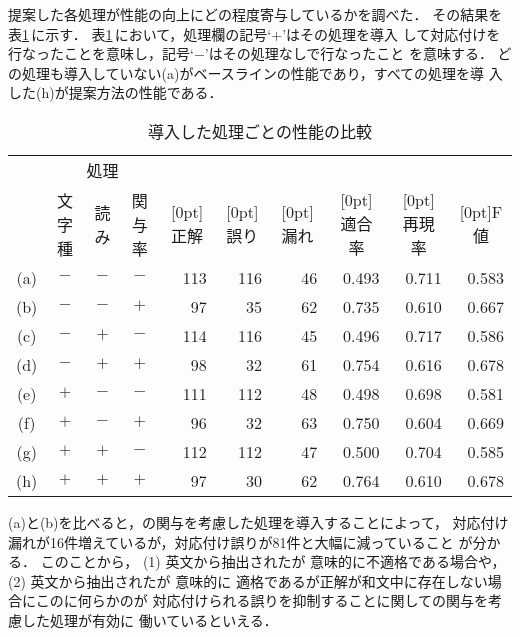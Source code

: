 提案した各処理が性能の向上にどの程度寄与しているかを調べた．
その結果を表\ref{tab:cond-effect}\,に示す．
表\ref{tab:cond-effect}\,において，処理欄の記号`$+$'はその処理を導入
して対応付けを行なったことを意味し，記号`$-$'はその処理なしで行なったこと
を意味する．
どの処理も導入していない(a)がベースラインの性能であり，すべての処理を導
入した(h)が提案方法の性能である．
\begin{table}[htbp]
\caption{導入した処理ごとの性能の比較}
\label{tab:cond-effect}
\begin{center}
\begin{tabular}{|c|c|c|c||r|r|r|r|r|r|}\hline
& \multicolumn{3}{|c||}{処理} & & & & & & \\\cline{2-4}
& 文字種 & 読み & 関与率 & \multicolumn{1}{c|}{\raisebox{1.5ex}[0pt]{正解}} & 
\multicolumn{1}{c|}{\raisebox{1.5ex}[0pt]{誤り}} &  
\multicolumn{1}{c|}{\raisebox{1.5ex}[0pt]{漏れ}} & 
\multicolumn{1}{c|}{\raisebox{1.5ex}[0pt]{適合率}} & 
\multicolumn{1}{c|}{\raisebox{1.5ex}[0pt]{再現率}} & 
\multicolumn{1}{c|}{\raisebox{1.5ex}[0pt]{F値}} \\\hline\hline
(a) & $-$ & $-$ & $-$ & 113 & 116 & 46 & 0.493 & 0.711 & 0.583 \\
(b) & $-$ & $-$ & $+$ &  97 &  35 & 62 & 0.735 & 0.610 & 0.667 \\
(c) & $-$ & $+$ & $-$ & 114 & 116 & 45 & 0.496 & 0.717 & 0.586 \\
(d) & $-$ & $+$ & $+$ &  98 &  32 & 61 & 0.754 & 0.616 & 0.678 \\
(e) & $+$ & $-$ & $-$ & 111 & 112 & 48 & 0.498 & 0.698 & 0.581 \\
(f) & $+$ & $-$ & $+$ &  96 &  32 & 63 & 0.750 & 0.604 & 0.669 \\
(g) & $+$ & $+$ & $-$ & 112 & 112 & 47 & 0.500 & 0.704 & 0.585 \\
(h) & $+$ & $+$ & $+$ &  97 &  30 & 62 & 0.764 & 0.610 & 0.678 \\\hline
\end{tabular}
\end{center}
\end{table}

(a)と(b)を比べると，{\N}の関与を考慮した処理を導入することによって，
対応付け漏れが16件増えているが，対応付け誤りが81件と大幅に減っていること
が分かる．
このことから，
(1) 英文から抽出された{\CPNP}が
意味的に不適格である場合や，
(2) 英文から抽出された{\CPNP}が
意味的に
適格であるが正解が和文中に存在しない場合にこの{\CPNP}に何らかの{\JNP}が
対応付けられる誤りを抑制することに関して{\N}の関与を考慮した処理が有効に
働いているといえる．

